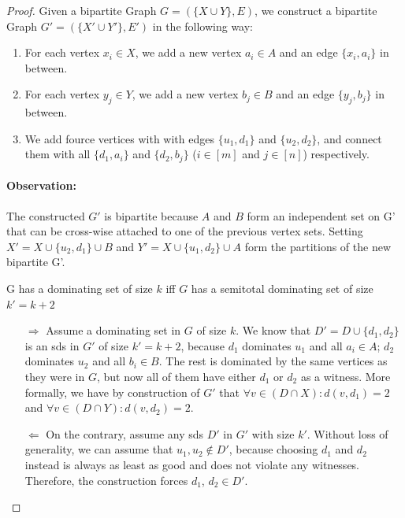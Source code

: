 \begin{proof}
    Given a bipartite Graph $G = ( \{X \cup Y\}, E)$, we construct a bipartite Graph $G' = (\{X' \cup Y'\},E')$ in the following way:
    \begin{enumerate}
        \item For each vertex $x_i \in X$, we add a new vertex $a_i \in A$  and an edge $\{x_i, a_i\}$ in between. 
        \item For each vertex $y_j \in Y$, we add a new vertex $b_j \in B$ and an edge $\{y_j, b_j\}$ in between.
        \item We add fource vertices with with edges $\{u_1, d_1\}$ and $\{u_2, d_2\}$, and connect them with all $\{d_1, a_i\}$ and $\{d_2, b_j\}$ ($i \in [m]$ and $j \in [n]$) respectively.
    \end{enumerate}
    \paragraph*{Observation:} The constructed $G'$ is bipartite because $A$ and $B$ form an independent set on G' that can be cross-wise attached to one of the previous vertex sets. Setting  $X' = X \cup \{u_2,d_1\} \cup B$ and $Y' = X \cup \{u_1,d_2\} \cup A$ form the partitions of the new bipartite G'.

    \begin{corollary} G has a dominating set of size $k$ iff $G$ has a semitotal dominating set of size $k' = k + 2$
    \end{corollary} 
    \begin{enumerate}
    \item[$\Rightarrow$] Assume a dominating set in $G$ of size $k$. We know that $D' = D\cup \{d_1,d_2\}$ is an sds in $G'$ of size $k' = k + 2$, because $d_1$ dominates $u_1$ and all $a_i \in A$; $d_2$ dominates $u_2$ and all $b_i \in B$. The rest is dominated by the same vertices as they were in $G$, but now all of them have either $d_1$ or $d_2$ as a witness.
    More formally, we have by construction of $G'$ that $\forall v \in (D \cap X): d(v, d_1) = 2$ and $\forall v \in (D \cap Y): d(v, d_2) = 2$.

    \item[$\Leftarrow$] On the contrary, assume any sds $D'$ in $G'$ with size $k'$. Without loss of generality, we can assume that $u_1, u_2 \notin D'$, because choosing $d_1$ and $d_2$ instead is always as least as good and does not violate any witnesses. Therefore, the construction forces $d_1$, $d_2 \in D'$. 


\end{enumerate}
\end{proof}
